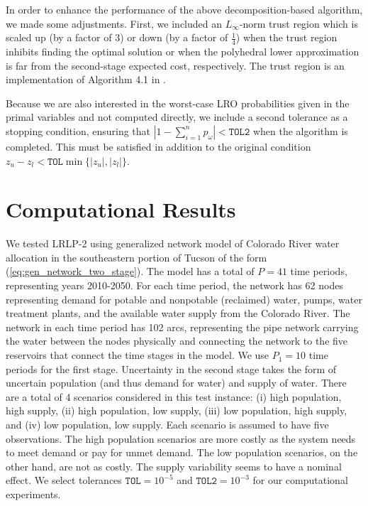 \documentclass{iserc}
\begin{document}
In order to enhance the performance of the above decomposition-based algorithm, we made some adjustments.
First, we included an $L_\infty$-norm trust region which is scaled up (by a factor of $3$) or down (by a factor of $\tfrac{1}{4}$) when the trust region inhibits finding the optimal solution or when the polyhedral lower approximation is far from the second-stage expected cost, respectively.
The trust region is an implementation of Algorithm 4.1 in \cite{nocedal1999numerical}.

Because we are also interested in the worst-case LRO probabilities given in the primal variables and not computed directly, we include a second tolerance as a stopping condition, ensuring that $\left| 1 - \sum_{i=1}^n p_\omega \right| < \texttt{TOL2}$ when the algorithm is completed.
This must be satisfied in addition to the original condition $z_u - z_l < \texttt{TOL}\min\{|z_u|,|z_l|\}$.

\section{Computational Results} \label{sec:comp_results}

We tested LRLP-2 using generalized network model of Colorado River water allocation in the southeastern portion of Tucson of the form (\ref{eq:gen_network_two_stage}).
The model has a total of $P = 41$ time periods, representing years 2010-2050. %
For each time period, the network has 62 nodes representing demand for potable and nonpotable (reclaimed) water, pumps, water treatment plants, and the available water supply from the Colorado River.
The network in each time period has 102 arcs, representing the pipe network carrying the water between the nodes physically and connecting the network to the five reservoirs that connect the time stages in the model.
We use $P_1 = 10$ time periods for the first stage.
Uncertainty in the second stage takes the form of uncertain population (and thus demand for water) and supply of water.
There are a total of 4 scenarios considered in this test instance: (i) high population, high supply, (ii) high population, low supply, (iii) low population, high supply, and (iv) low population, low supply.
Each scenario is assumed to have five observations.
The high population scenarios are more costly as the system needs to meet demand or pay for unmet demand.
The low population scenarios, on the other hand, are not as costly. The supply variability seems to have a nominal effect. 
We select tolerances $\texttt{TOL} = 10^{-5}$ and $\texttt{TOL2} = 10^{-3}$ for our computational experiments.
\end{document}
